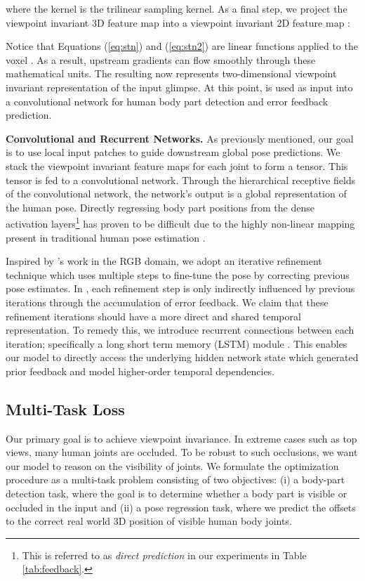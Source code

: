\documentclass[runningheads]{llncs}
\begin{document}
	where the kernel  is the trilinear sampling kernel. As a final step, we project the viewpoint invariant 3D feature map  into a viewpoint invariant 2D feature map :
	
	Notice that Equations (\ref{eq:stn}) and (\ref{eq:stn2}) are linear functions applied to the voxel . As a result, upstream gradients can flow smoothly through these mathematical units.
	The resulting  now represents two-dimensional viewpoint invariant representation of the input glimpse. At this point,  is used as input into a convolutional network for human body part detection and error feedback prediction.

	\textbf{Convolutional and Recurrent Networks.} As previously mentioned, our goal is to use local input patches to guide downstream global pose predictions. We stack the viewpoint invariant feature maps  for each joint to form a  tensor. This tensor is fed to a convolutional network. Through the hierarchical receptive fields of the convolutional network, the network's output is a global representation of the human pose. Directly regressing body part positions from the dense activation layers\footnote{This is referred to as \textit{direct prediction} in our experiments in Table \ref{tab:feedback}.} has proven to be difficult due to the highly non-linear mapping present in traditional human pose estimation \cite{tompson2014joint}.

	Inspired by \cite{carreira2015human}'s work in the RGB domain, we adopt an iterative refinement technique which uses multiple steps to fine-tune the pose by correcting previous pose estimates.
	In \cite{carreira2015human}, each refinement step is only indirectly influenced by previous iterations through the accumulation of error feedback.
	We claim that these refinement iterations should have a more direct and shared temporal representation.
	To remedy this, we introduce recurrent connections between each iteration; specifically a long short term memory (LSTM) module \cite{hochreiter1997long}.
	This enables our model to directly access the underlying hidden network state which generated prior feedback and model higher-order temporal dependencies.

	\subsection{Multi-Task Loss}

	Our primary goal is to achieve viewpoint invariance. In extreme cases such as top views, many human joints are occluded.
	To be robust to such occlusions, we want our model to reason on the visibility of joints.
	We formulate the optimization procedure as a multi-task problem consisting of two objectives: (i) a body-part detection task, where the goal is to determine whether a body part is visible or occluded in the input and (ii) a pose regression task, where we predict the offsets to the correct real world 3D position of visible human body joints.
\end{document}
